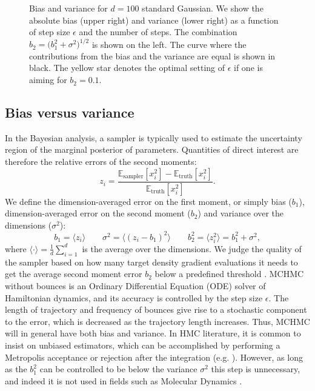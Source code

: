 \documentclass[twoside,11pt]{article}
\begin{document}
\begin{figure}
    \caption{Bias and variance for $d=100$ standard Gaussian. We show the absolute bias (upper right) and variance (lower right) as a function of step size $\epsilon$ and the number of steps. The combination $b_2=({b_1^2+\sigma^2)^{1/2}}$ is shown on the left. The curve where the contributions from the bias and the variance are equal is shown in black. The yellow star denotes the optimal setting of $\epsilon$ if one is aiming for $b_2 = 0.1$.}
    \label{fig:b}
\end{figure}

\subsection{Bias versus variance}

In the Bayesian analysis, a sampler is typically used to estimate the uncertainty region of the marginal posterior of parameters. Quantities of direct interest are therefore the relative errors of the second moments:
\begin{equation}
    z_i = \frac{\mathbb{E}_{\text{sampler}} [x_i^2] - \mathbb{E}_{\text{truth}} [x_i^2]}{\mathbb{E}_{\text{truth}} [x_i^2]}.
\end{equation}
We define the dimension-averaged error on the first moment, or simply bias ($b_1$), dimension-averaged error on the second moment ($b_2$) and variance over the dimensions ($\sigma^2$):
\begin{equation}
    b_1 = \langle z_{i} \rangle \qquad \sigma^2 = \langle (z_{i} - b_1 )^2 \rangle \qquad b_2^2 = \langle z_i^2 \rangle = b_1^2 + \sigma^2,
    \label{eq:b}
\end{equation}
where $\langle \cdot \rangle = \frac{1}{d} \sum_{i = 1}^d$ is the average over the dimensions. We judge the quality of the sampler based on how many target density gradient evaluations it needs to get the average second moment error $b_2$ below a predefined threshold \citep{UsingBias, DLMC}. MCHMC without bounces is an Ordinary Differential Equation (ODE) solver of Hamiltonian dynamics, and its accuracy is controlled by the step size $\epsilon$. The length of trajectory and frequency of bounces  give rise to a stochastic component to the error, which is decreased as the trajectory length increases. Thus, MCHMC will in general have both bias and variance. In HMC literature, it is common to insist on unbiased estimators, which can be accomplished by performing a Metropolis acceptance or rejection after the integration (e.g. \cite{conceptualHMC}). However, as long as the $b_1^2$ can be controlled to be below the 
variance $\sigma^2$ this step is unnecessary, and indeed it is not used in fields such as Molecular Dynamics \citep{MolecularDynamics}.
\end{document}
